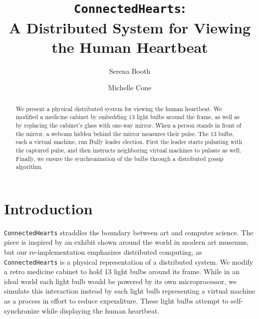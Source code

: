 \documentclass[preprint,review,12pt]{cs262}
\begin{document}
\begin{frontmatter}

\title{\texttt{ConnectedHearts}: \\ A Distributed System for Viewing the Human Heartbeat}

\author[label1, label0]{Serena Booth}
\address[label1]{sbooth@college.harvard.edu}


\author[label2, label0]{Michelle Cone}
\address[label2]{mcone@college.harvard.edu}


\begin{abstract}
We present a physical distributed system for viewing the human heartbeat. We modified a medicine cabinet by embedding 13 light bulbs around the frame, as well as by replacing the cabinet's glass with one-way mirror. When a person stands in front of the mirror, a webcam hidden behind the mirror measures their pulse. The 13 bulbs, each a virtual machine, run Bully leader election. First the leader starts pulsating with the captured pulse, and then instructs neighboring virtual machines to pulsate as well. Finally, we ensure the synchronization of the bulbs through a distributed gossip algorithm.
\end{abstract}


\end{frontmatter}



\section{Introduction}
\label{sec1}

\texttt{ConnectedHearts} straddles the boundary between art and computer science. The piece is inspired by an exhibit shown around the world in modern art museums, but our re-implementation emphasizes distributed computing, as \texttt{ConnectedHearts} is a physical representation of a distributed system. We modify a retro medicine cabinet to hold 13 light bulbs around its frame. While in an ideal world each light bulb would be powered by its own microprocessor, we simulate this interaction instead by each light bulb representing a virtual machine as a process in effort to reduce expenditure. These light bulbs attempt to self-synchronize while displaying the human heartbeat. 
\end{document}

